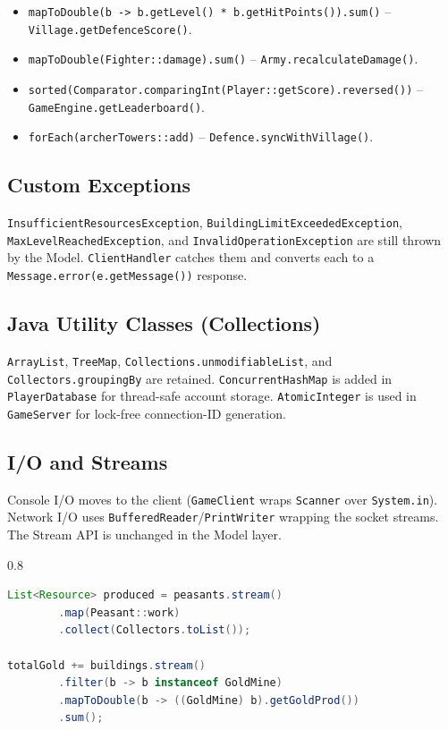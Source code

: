 \documentclass[format=acmsmall, review=false, screen=true]{acmart}
\begin{document}
\begin{itemize}[noitemsep]
  \item \texttt{mapToDouble(b -> b.getLevel() * b.getHitPoints()).sum()} --
        \texttt{Village.getDefenceScore()}.
  \item \texttt{mapToDouble(Fighter::damage).sum()} --
        \texttt{Army.recalculateDamage()}.
  \item \texttt{sorted(Comparator.comparingInt(Player::getScore).reversed())}
        -- \texttt{GameEngine.getLeaderboard()}.
  \item \texttt{forEach(archerTowers::add)} -- \texttt{Defence.syncWithVillage()}.
\end{itemize}

\subsection{Custom Exceptions}

\texttt{InsufficientResourcesException}, \texttt{BuildingLimitExceededException},
\texttt{MaxLevelReachedException}, and \texttt{InvalidOperationException} are
still thrown by the Model.  \texttt{ClientHandler} catches them and converts
each to a \texttt{Message.error(e.getMessage())} response.

\subsection{Java Utility Classes (Collections)}

\texttt{ArrayList}, \texttt{TreeMap}, \texttt{Collections.unmodifiableList},
and \texttt{Collectors.groupingBy} are retained.
\texttt{ConcurrentHashMap} is added in \texttt{PlayerDatabase} for thread-safe
account storage.  \texttt{AtomicInteger} is used in \texttt{GameServer} for
lock-free connection-ID generation.

\subsection{I/O and Streams}

Console I/O moves to the client (\texttt{GameClient} wraps
\texttt{Scanner} over \texttt{System.in}).  Network I/O uses
\texttt{BufferedReader}/\texttt{PrintWriter} wrapping the socket streams.
The Stream API is unchanged in the Model layer.

\begin{spacing}{0.8}
\begin{lstlisting}[language=Java, caption={Stream-based resource collection.}, label=lst:streams]
List<Resource> produced = peasants.stream()
        .map(Peasant::work)
        .collect(Collectors.toList());

totalGold += buildings.stream()
        .filter(b -> b instanceof GoldMine)
        .mapToDouble(b -> ((GoldMine) b).getGoldProd())
        .sum();
\end{lstlisting}
\end{spacing}
\end{document}
